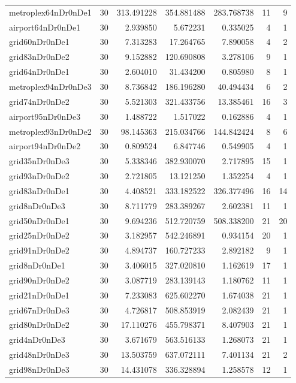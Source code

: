 \begin{longtable}{|l|r|r|r|r|r|r|}
metroplex64nDr0nDe1 & 30 & 313.491228 & 354.881488 & 283.768738 & 11 & 9 \\
airport64nDr0nDe1 & 30 & 2.939850 & 5.672231 & 0.335025 & 4 & 1 \\
grid60nDr0nDe1 & 30 & 7.313283 & 17.264765 & 7.890058 & 4 & 2 \\
grid83nDr0nDe2 & 30 & 9.152882 & 120.690808 & 3.278106 & 9 & 1 \\
grid64nDr0nDe1 & 30 & 2.604010 & 31.434200 & 0.805980 & 8 & 1 \\
metroplex94nDr0nDe3 & 30 & 8.736842 & 186.196280 & 40.494434 & 6 & 2 \\
grid74nDr0nDe2 & 30 & 5.521303 & 321.433756 & 13.385461 & 16 & 3 \\
airport95nDr0nDe3 & 30 & 1.488722 & 1.517022 & 0.162886 & 4 & 1 \\
metroplex93nDr0nDe2 & 30 & 98.145363 & 215.034766 & 144.842424 & 8 & 6 \\
airport94nDr0nDe2 & 30 & 0.809524 & 6.847746 & 0.549905 & 4 & 1 \\
grid35nDr0nDe3 & 30 & 5.338346 & 382.930070 & 2.717895 & 15 & 1 \\
grid93nDr0nDe2 & 30 & 2.721805 & 13.121250 & 1.352254 & 4 & 1 \\
grid83nDr0nDe1 & 30 & 4.408521 & 333.182522 & 326.377496 & 16 & 14 \\
grid8nDr0nDe3 & 30 & 8.711779 & 283.389267 & 2.602381 & 11 & 1 \\
grid50nDr0nDe1 & 30 & 9.694236 & 512.720759 & 508.338200 & 21 & 20 \\
grid25nDr0nDe2 & 30 & 3.182957 & 542.246891 & 0.934154 & 20 & 1 \\
grid91nDr0nDe2 & 30 & 4.894737 & 160.727233 & 2.892182 & 9 & 1 \\
grid8nDr0nDe1 & 30 & 3.406015 & 327.020810 & 1.162619 & 17 & 1 \\
grid90nDr0nDe2 & 30 & 3.087719 & 283.139143 & 1.180762 & 11 & 1 \\
grid21nDr0nDe1 & 30 & 7.233083 & 625.602270 & 1.674038 & 21 & 1 \\
grid67nDr0nDe3 & 30 & 4.726817 & 508.853919 & 2.082439 & 21 & 1 \\
grid80nDr0nDe2 & 30 & 17.110276 & 455.798371 & 8.407903 & 21 & 1 \\
grid4nDr0nDe3 & 30 & 3.671679 & 563.516133 & 1.268073 & 21 & 1 \\
grid48nDr0nDe3 & 30 & 13.503759 & 637.072111 & 7.401134 & 21 & 2 \\
grid98nDr0nDe3 & 30 & 14.431078 & 336.328894 & 1.258578 & 12 & 1 \\

\end{longtable}
